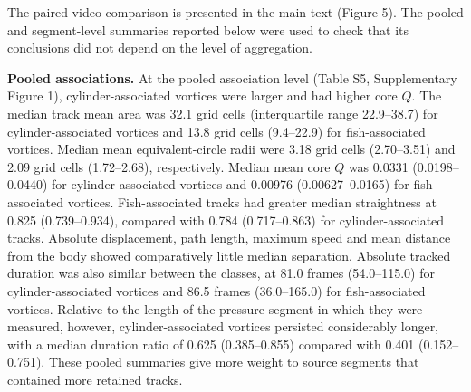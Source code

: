\documentclass[11pt,a4paper]{article}
\begin{document}
The paired-video comparison is presented in the main text (Figure 5). The pooled and segment-level summaries reported below were used to check that its conclusions did not depend on the level of aggregation.

\textbf{Pooled associations.} At the pooled association level (Table S5, Supplementary Figure 1), cylinder-associated vortices were larger and had higher core $Q$. The median track mean area was 32.1 grid cells (interquartile range 22.9--38.7) for cylinder-associated vortices and 13.8 grid cells (9.4--22.9) for fish-associated vortices. Median mean equivalent-circle radii were 3.18 grid cells (2.70--3.51) and 2.09 grid cells (1.72--2.68), respectively. Median mean core $Q$ was 0.0331 (0.0198--0.0440) for cylinder-associated vortices and 0.00976 (0.00627--0.0165) for fish-associated vortices. Fish-associated tracks had greater median straightness at 0.825 (0.739--0.934), compared with 0.784 (0.717--0.863) for cylinder-associated tracks. Absolute displacement, path length, maximum speed and mean distance from the body showed comparatively little median separation. Absolute tracked duration was also similar between the classes, at 81.0 frames (54.0--115.0) for cylinder-associated vortices and 86.5 frames (36.0--165.0) for fish-associated vortices. Relative to the length of the pressure segment in which they were measured, however, cylinder-associated vortices persisted considerably longer, with a median duration ratio of 0.625 (0.385--0.855) compared with 0.401 (0.152--0.751). These pooled summaries give more weight to source segments that contained more retained tracks.
\end{document}
